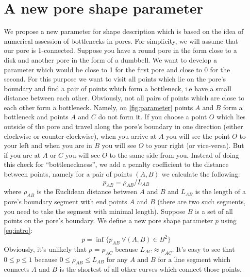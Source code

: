 \documentclass[reprint,amsmath,amssymb,aps,pre,showkeys,showpacs]{revtex4-1}
\begin{document}
\section{A new pore shape parameter}
We propose a new parameter for shape description which is based on the idea of
numerical assession of bottlenecks in pores. For simplicity, we will assume
that our pore is 1-connected. Suppose you have a round pore in the form close to
a disk and another pore in the form of a dumbbell. We want to develop a
parameter which would be close to 1 for the first pore and close to 0 for the
second. For this purpose we want to visit all points which lie on the pore's
boundary and find a pair of points which form a bottleneck, i.e have a small
distance between each other. Obviously, not all pairs of points which are close
to each other form a bottleneck. Namely, on \cref{fig:parameter} points $A$ and
$B$ form a bottleneck and points $A$ and $C$ do not form it. If you choose a
point $O$ which lies outside of the pore and travel along the pore's boundary in
one direction (either clockwise or counter-clockwise), when you arrive at $A$
you will see the point $O$ to your left and when you are in $B$ you will see $O$
to your right (or vice-versa). But if you are at $A$ or $C$ you will see $O$ to
the same side from you. Instead of doing this check for ``bottleneckness'', we
add a penalty coefficient to the distance between points, namely for a pair of
points $(A, B)$ we calculate the following:
\begin{equation}
  p_{AB} = \rho_{AB} / L_{AB}
  \label{eq:intro}
\end{equation}
where $\rho_{AB}$ is the Euclidean distance between $A$ and $B$ and $L_{AB}$ is
the length of a pore's boundary segment with end points $A$ and $B$ (there are
two such segments, you need to take the segment with minimal length). Suppose
$B$ is a set of all points on the pore's boundary. We define a new pore shape
parameter $p$ using \ref{eq:intro}:
\begin{equation}
  p = \inf \{p_{AB} \ \forall (A, B) \in B^2\}
  \label{eq:pre-awesomeness}
\end{equation}
Obviously, it's unlikely that $p$ = $p_{AC}$ because $L_{AC} \approx \rho_{AC}$.
It's easy to see that $0 \le p \le 1$ because $0 \le \rho_{AB} \le L_{AB}$ for
any $A$ and $B$ for a line segment which connects $A$ and $B$ is the shortest
of all other curves which connect those points.
\end{document}

